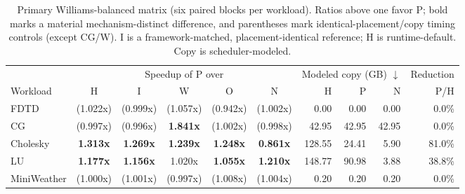 \begin{table}[t]
\centering
\setlength{\tabcolsep}{3.1pt}
\caption{Primary Williams-balanced matrix (six paired blocks per workload). Ratios above one favor P; bold marks a material mechanism-distinct difference, and parentheses mark identical-placement/copy timing controls (except CG/W). I is a framework-matched, placement-identical reference; H is runtime-default. Copy is scheduler-modeled.}
\label{tab:primary-matrix}
\begin{tabular*}{\textwidth}{@{\hspace{5pt}}l@{\extracolsep{\fill}}cccccrrrr@{\hspace{5pt}}}
\toprule
& \multicolumn{5}{c}{Speedup of P over} & \multicolumn{3}{c}{Modeled copy (GB) $\downarrow$} & Reduction \\
\cmidrule(lr){2-6}\cmidrule(lr){7-9}\cmidrule(lr){10-10}
Workload & H & I & W & O & N & H & P & N & P/H \\
\midrule
FDTD & (1.022x) & (0.999x) & (1.057x) & (0.942x) & (1.002x) & 0.00 & 0.00 & 0.00 & 0.0\% \\
CG & (0.997x) & (0.996x) & \textbf{1.841x} & (1.002x) & (0.998x) & 42.95 & 42.95 & 42.95 & 0.0\% \\
Cholesky & \textbf{1.313x} & \textbf{1.269x} & \textbf{1.239x} & \textbf{1.248x} & \textbf{0.861x} & 128.55 & 24.41 & 5.90 & 81.0\% \\
LU & \textbf{1.177x} & \textbf{1.156x} & 1.020x & \textbf{1.055x} & \textbf{1.210x} & 148.77 & 90.98 & 3.88 & 38.8\% \\
MiniWeather & (1.000x) & (1.001x) & (0.997x) & (1.008x) & (1.004x) & 0.20 & 0.20 & 0.20 & 0.0\% \\
\bottomrule
\end{tabular*}
\end{table}
